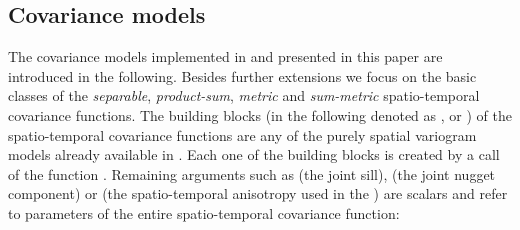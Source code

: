 \subsection{Covariance models}

The covariance models implemented in  and presented in this paper are introduced in the following. Besides further extensions we focus on the basic classes of the \emph{separable}, \emph{product-sum}, \emph{metric} and \emph{sum-metric} spatio-temporal covariance functions. The building blocks (in the following denoted as ,  or ) of the spatio-temporal covariance functions are any of the purely spatial variogram models already available in . Each one of the building blocks is created by a call of the function . Remaining arguments such as  (the joint sill),  (the joint nugget component) or  (the spatio-temporal anisotropy used in the ) are scalars and refer to parameters of the entire spatio-temporal covariance function:

